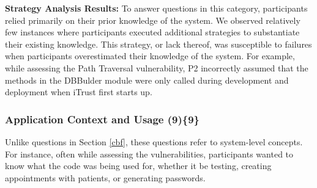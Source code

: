 \documentclass[10pt,journal,compsoc]{IEEEtran}
\begin{document}
\textbf{Strategy Analysis Results:}
To answer questions in this category, participants relied primarily on their prior knowledge of the system.
We observed relatively few instances where participants executed additional strategies to substantiate their existing knowledge. 
This strategy, or lack thereof, was susceptible to failures when participants overestimated their knowledge of the system.
For example, while assessing the Path Traversal vulnerability, P2 incorrectly assumed that the methods in the DBBulder module were only called during development and deployment when iTrust first starts up.




% 


\subsubsection{Application Context and Usage (9)\{9\}}\label{acu}

Unlike questions in Section \ref{cbf}, these questions refer to system-level concepts.
For instance, often while assessing the vulnerabilities, participants wanted to know what the code was being used for, whether it be testing, creating appointments with patients, or generating passwords.
\\
\end{document}
